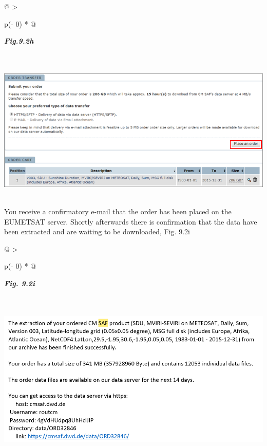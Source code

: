 \documentclass[
  letterpaper,
  DIV=11,
  numbers=noendperiod]{scrreprt}
\begin{document}
\begin{longtable}[]{@{}
  >{\raggedright\arraybackslash}p{(\columnwidth - 0\tabcolsep) * }@{}}
\toprule\noalign{}
\begin{minipage}[b]{\linewidth}\raggedright
\textbf{\emph{Fig.9.2h}}
\end{minipage} \\
\midrule\noalign{}
\endhead
\bottomrule\noalign{}
\endlastfoot
\includegraphics[width=6.15232in,height=2.70945in]{figures/Fig9.2h.png} \\
\end{longtable}

You receive a confirmatory e-mail that the order has been placed on the
EUMETSAT server. Shortly afterwards there is confirmation that the data
have been extracted and are waiting to be downloaded, Fig. 9.2i

\begin{longtable}[]{@{}
  >{\raggedright\arraybackslash}p{(\columnwidth - 0\tabcolsep) * }@{}}
\toprule\noalign{}
\begin{minipage}[b]{\linewidth}\raggedright
\textbf{\emph{Fig. 9.2i}}
\end{minipage} \\
\midrule\noalign{}
\endhead
\bottomrule\noalign{}
\endlastfoot
\includegraphics[width=6.10193in,height=2.96714in]{figures/Fig9.2i.png} \\
\end{longtable}
\end{document}
